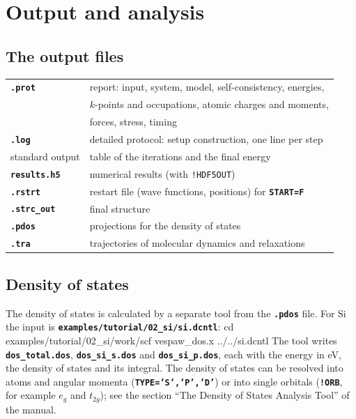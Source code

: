 \documentclass[11pt,a4paper,oneside]{book}
\newcommand{\key}[1]{\textbf{\texttt{#1}}}
\newcommand{\file}[1]{\textbf{\texttt{#1}}}
\newenvironment{shell}{\small\verbatim}{\endverbatim}
\newcommand{\deck}[1]{{\small}}
\begin{document}
\chapter{Output and analysis}\label{chap:output}
\minitoc

\section{The output files}

\begin{center}
\begin{tabular}{ll}\toprule
\file{.prot} & report: input, system, model, self-consistency, energies, \\
 & $k$-points and occupations, atomic charges and moments, \\
 & forces, stress, timing \\
\file{.log} & detailed protocol: setup construction, one line per step \\
standard output & table of the iterations and the final energy \\
\file{results.h5} & numerical results (with \texttt{!HDF5OUT}) \\
\file{.rstrt} & restart file (wave functions, positions) for \key{START=F} \\
\file{.strc\_out} & final structure \\
\file{.pdos} & projections for the density of states \\
\file{.tra} & trajectories of molecular dynamics and relaxations \\ \bottomrule
\end{tabular}
\end{center}

\section{Density of states}

The density of states is calculated by a separate tool from the
\file{.pdos} file. For Si the input is
\file{examples/tutorial/02\_si/si.dcntl}:
\deck{../../../examples/tutorial/02_si/si.dcntl}
\begin{shell}
cd examples/tutorial/02_si/work/scf
vespaw_dos.x ../../si.dcntl
\end{shell}
The tool writes \file{dos\_total.dos}, \file{dos\_si\_s.dos} and
\file{dos\_si\_p.dos}, each with the energy in eV, the density of
states and its integral. The density of states can be resolved into
atoms and angular momenta (\key{TYPE='S','P','D'}) or into single
orbitals (\key{!ORB}, for example $e_g$ and $t_{2g}$); see the section
``The Density of States Analysis Tool'' of the manual.
\end{document}
